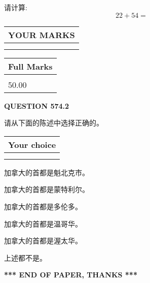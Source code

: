 \documentclass{ctexart}
\begin{document}
  
 
请计算:
\begin{equation}
22 +  %
54 = \nonumber
\end{equation}
 

 

 
  
\vspace{0.2in}
  
\noindent\begin{tabular}{|l|}
\hline
 YOUR MARKS  \\
\hline
 \\ 
 \\ 
\hline
\end{tabular}
\hspace{0.05in} \begin{tabular}{|l|}
\hline
 Full Marks  \\
\hline
 \\ 
50.00 \\
\hline
\end{tabular}
{\textbf{\Large{QUESTION
574.2 
}}}
  
  
请从下面的陈述中选择正确的。
  
  
\noindent\hspace{3.0in} \begin{tabular}{|l|}
\hline
Your choice \\
\hline
 \\ 
 \\ 
\hline
\end{tabular}
  
  
 
 
加拿大的首都是魁北克市。
 
 
加拿大的首都是蒙特利尔。
 
 
加拿大的首都是多伦多。
 
 
加拿大的首都是温哥华。
 
 
加拿大的首都是渥太华。
 
 
 上述都不是。
 
 
   
   
 \vspace{0.2in}
 
   
   
   
   
\vspace{1.0in} 
{\textbf{\large{ *** END OF PAPER, THANKS *** }}} 
   
\end{document}
